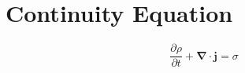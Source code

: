 \documentclass[a5paper,12pt]{article}
\begin{document}

\clearpage
\tableofcontents
\listoftables
\listoffigures
\clearpage

\section{Continuity Equation}
\begin{equation}
\frac{\partial \rho}{\partial t}+\mathbf{\nabla}\cdot\mathbf{j}=\sigma
\end{equation}

\clearpage
{}
\printindex
\end{document}
